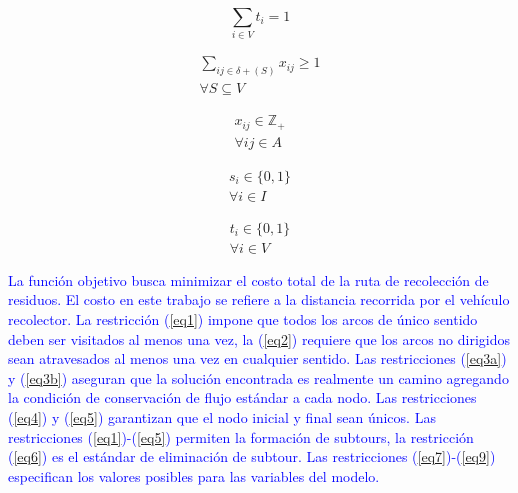 \documentclass[spanish, conference]{IEEEtran}
\begin{document}
{\begin{equation} \tag{5} \label{eq5}
\sum_{i \in V} t_i = 1 
\end{equation}
\hbox{}

\begin{equation} \tag{6} \label{eq6}
\begin{gathered}
    \sum_{i j \in \delta + (S)} x_{i j} \geq 1 \\
    \forall S \subseteq V
\end{gathered}
\end{equation}
\hbox{}

\begin{equation} \tag{7} \label{eq7}
\begin{gathered}
    x_{i j} \in \mathbb{Z}_+ \\
    \forall i j \in A
\end{gathered}
\end{equation}
\hbox{}

\begin{equation} \tag{8} \label{eq8}
\begin{gathered}
    s_i \in \{0,1\} \\
    \forall i \in I
\end{gathered}
\end{equation}
\hbox{}

\begin{equation} \tag{9} \label{eq9}
\begin{gathered}
    t_i \in \{0,1\} \\
    \forall i \in V
\end{gathered}
\end{equation}

\textcolor{blue}{La función objetivo busca minimizar el costo total de la ruta de recolección de residuos. El costo en este trabajo se refiere a la distancia recorrida por el vehículo recolector. La restricción (\ref{eq1}) impone que todos los arcos de único sentido deben ser visitados al menos una vez, la (\ref{eq2}) requiere que los arcos no dirigidos sean atravesados al menos una vez en cualquier sentido. Las restricciones (\ref{eq3a}) y (\ref{eq3b}) aseguran que la solución encontrada es realmente un camino agregando la condición de conservación de flujo estándar a cada nodo. Las restricciones (\ref{eq4}) y (\ref{eq5}) garantizan que el nodo inicial y final sean únicos. Las restricciones (\ref{eq1})-(\ref{eq5}) permiten la formación de subtours, la restricción (\ref{eq6}) es el estándar de eliminación de subtour. Las restricciones (\ref{eq7})-(\ref{eq9}) especifican los valores posibles para las variables del modelo.}

}
\end{document}
